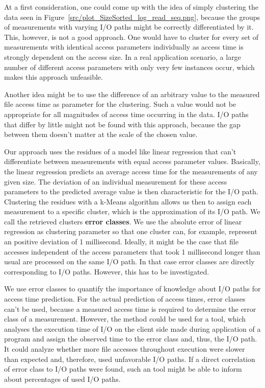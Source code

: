 \documentclass{superfri}
\begin{document}
	At a first consideration, one could come up with the idea of simply clustering the data seen in Figure~\ref{src/plot_SizeSorted_log_read_seq.png}, because the groups of measurements with varying I/O paths might be correctly differentiated by it. 
	This, however, is not a good approach. One would have to cluster for every set of measurements with identical access parameters individually as access time is strongly dependent on the access size. 
	In a real application scenario, a large number of different access parameters with only very few instances occur, which makes this approach unfeasible.
	
	Another idea might be to use the difference of an arbitrary value to the measured file access time as parameter for the clustering. 
	Such a value would not be appropriate for all magnitudes of access time occurring in the data.
	I/O paths that differ by little might not be found with this approach, because the gap between them doesn't matter at the scale of the chosen value.
	
	Our approach uses the residues of a model like linear regression that can't differentiate between measurements with equal access parameter values.
	Basically, the linear regression predicts an average access time for the measurements of any given size.
	The deviation of an individual measurement for these access parameters to the predicted average value is then characteristic for the I/O path.
	Clustering the residues with a k-Means algorithm allows us then to assign each measurement to a specific cluster, which is the approximation of its I/O path.
	We call the retrieved clusters \textbf{error classes}.
	We use the absolute error of linear regression as clustering parameter so that one cluster can, for example, represent an positive deviation of 1 millisecond.
	Ideally, it might be the case that file accesses independent of the access parameters that took 1 millisecond longer than usual are processed on the same I/O path.
	In that case error classes are directly corresponding to I/O paths. 
	However, this has to be investigated.
	
	\medskip
	
	We use error classes to quantify the importance of knowledge about I/O paths for access time prediction. 
	For the actual prediction of access times, error classes can't be used, because a measured access time is required to determine the error class of a measurement.
	However, the method could be used for a tool, which analyses the execution time of I/O on the client side made during application of a program and assign the observed time to the error class and, thus, the I/O path. 
	It could analyze whether more file accesses throughout execution were slower than expected and, therefore, used unfavorable I/O paths.
	If a direct correlation of error class to I/O paths were found, such an tool might be able to inform about percentages of used I/O paths.
	
\end{document}
